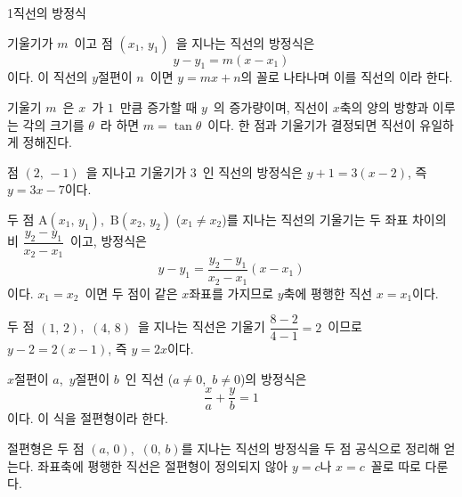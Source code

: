 \documentclass[10pt]{article}
\begin{document}

\begin{dmconcept}{1}{직선의 방정식}
\setlength{\parskip}{2.0mm plus 2.1mm minus 0mm}\linespread{1.30}\selectfont%


기울기가 $m$\ 이고 점 $(x_1,\, y_1)$\ 을 지나는 직선의 방정식은
\begin{equation*}
  y - y_1 = m(x - x_1)
\end{equation*}
이다. 이 직선의 $y$절편이 $n$\ 이면 $y = mx + n$의 꼴로 나타나며 이를 직선의 이라 한다.

\begin{dmexplain}
기울기 $m$\ 은 $x$\ 가 $1$\ 만큼 증가할 때 $y$\ 의 증가량이며, 직선이 $x$축의 양의 방향과 이루는 각의 크기를 $\theta$\ 라 하면 $m = \tan \theta$\ 이다. 한 점과 기울기가 결정되면 직선이 유일하게 정해진다.
\end{dmexplain}

\begin{dmexample}
점 $(2,\, -1)$\ 을 지나고 기울기가 $3$\ 인 직선의 방정식은 $y + 1 = 3(x - 2)$, 즉 $y = 3x - 7$이다.
\end{dmexample}


두 점 $\mathrm{A}(x_1,\, y_1)$,\ $\mathrm{B}(x_2,\, y_2)$ ($x_1 \ne x_2$)를 지나는 직선의 기울기는 두 좌표 차이의 비 $\dfrac{y_2 - y_1}{x_2 - x_1}$\ 이고, 방정식은
\begin{equation*}
  y - y_1 = \frac{y_2 - y_1}{x_2 - x_1}(x - x_1)
\end{equation*}
이다. $x_1 = x_2$\ 이면 두 점이 같은 $x$좌표를 가지므로 $y$축에 평행한 직선 $x = x_1$이다.

\begin{dmexample}
두 점 $(1,\, 2)$,\ $(4,\, 8)$\ 을 지나는 직선은 기울기 $\dfrac{8 - 2}{4 - 1} = 2$\ 이므로 $y - 2 = 2(x - 1)$, 즉 $y = 2x$이다.
\end{dmexample}


$x$절편이 $a$,\ $y$절편이 $b$\ 인 직선 ($a \ne 0$,\ $b \ne 0$)의 방정식은
\begin{equation*}
  \frac{x}{a} + \frac{y}{b} = 1
\end{equation*}
이다. 이 식을 절편형이라 한다.

\begin{dmnote}
절편형은 두 점 $(a,\, 0)$,\ $(0,\, b)$를 지나는 직선의 방정식을 두 점 공식으로 정리해 얻는다. 좌표축에 평행한 직선은 절편형이 정의되지 않아 $y = c$나 $x = c$\ 꼴로 따로 다룬다.
\end{dmnote}

\vspace{45.0mm}%
\end{dmconcept}
\end{document}
